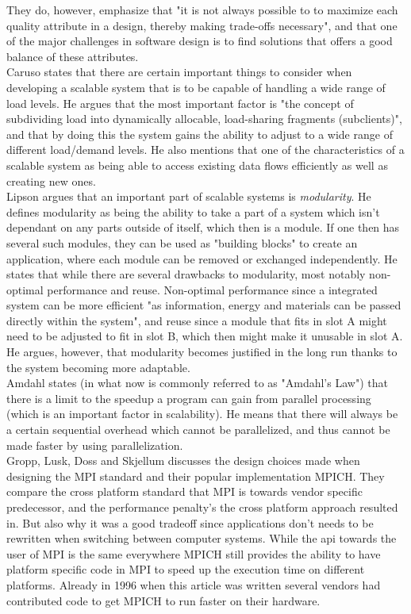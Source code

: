 \documentclass{article}
\begin{document}
{They do, however, emphasize that "it is not always possible to to maximize
each quality attribute in a design, thereby making trade-offs necessary", and
that one of the major challenges in software design is to find solutions that
offers a good balance of these attributes.
\\

Caruso \cite{caruso1997toward} states that there are certain important things
to consider when developing a scalable system that is to be capable of handling
a wide range of load levels. He argues that the most important factor is "the
concept of subdividing load into dynamically allocable, load-sharing fragments
(subclients)", and that by doing this the system gains the ability to adjust to
a wide range of different load/demand levels.
He also mentions that one of the characteristics of a scalable system as being
able to access existing data flows efficiently as well as creating new ones.
\\

Lipson \cite{lipson2007principles} argues that an important part of scalable
systems is \emph{modularity}. He defines modularity as being the ability to
take a part of a system which isn't dependant on any parts outside of itself,
which then is a module. If one then has several such modules, they can be used
as "building blocks" to create an application, where each module can be removed
or exchanged independently.  He states that while there are several drawbacks
to modularity, most notably non-optimal performance and reuse.  Non-optimal
performance since a integrated system can be more efficient "as information,
energy and materials can be passed directly within the system", and reuse since
 a module that fits in slot A might need to be adjusted to fit in slot B,
which then might make it unusable in slot A. He argues, however, that
modularity becomes justified in the long run thanks to the system becoming more
adaptable.
\\

Amdahl \cite{amdahl1967validity} states (in what now is commonly referred to as
"Amdahl's Law") that there is a limit to the speedup a program can gain from
parallel processing (which is an important factor in scalability).  He means
that there will always be a certain sequential overhead which cannot be
parallelized, and thus cannot be made faster by using parallelization.
\\

Gropp, Lusk, Doss and Skjellum\cite{gropp1996high} discusses the design choices made when
designing the MPI standard and their popular implementation MPICH. They
compare the cross platform standard that MPI is towards vendor specific
predecessor, and the performance penalty's the cross platform approach resulted
in. But also why it was a good tradeoff since applications don't needs to be
rewritten when switching between computer systems. While the api towards
the user of MPI is the same everywhere MPICH still provides the ability to
have platform specific code in MPI to speed up the execution time on different
platforms. Already in 1996 when this article was written several vendors
had contributed code to get MPICH to run faster on their hardware.
\\

}
\end{document}
